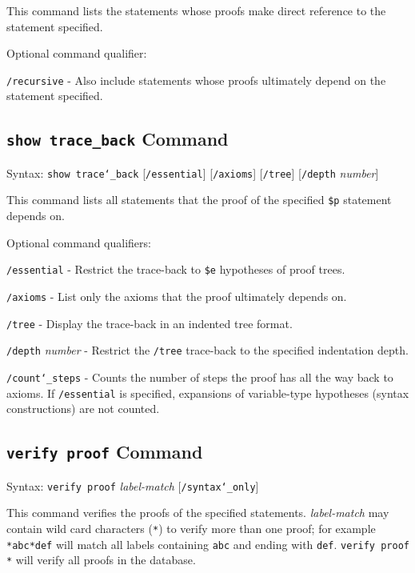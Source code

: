 This command lists the statements whose proofs make direct reference to
the statement specified.

Optional command qualifier:

    \texttt{/recursive} - Also include statements whose proofs ultimately
        depend on the statement specified.



\subsection{\texttt{show trace\_back} Command}
Syntax:  \texttt{show trace{\char`\_}back} [\texttt{/essential}] [\texttt{/axioms}]
    [\texttt{/tree}] [\texttt{/depth} {\em number}]

This command lists all statements that the proof of the specified
\texttt{\$p} statement depends on.

Optional command qualifiers:

    \texttt{/essential} - Restrict the trace-back to \texttt{\$e}
         hypotheses of proof trees.

    \texttt{/axioms} - List only the axioms that the proof ultimately depends on.

    \texttt{/tree} - Display the trace-back in an indented tree format.

    \texttt{/depth} {\em number} - Restrict the \texttt{/tree} trace-back to the
        specified indentation depth.

    \texttt{/count{\char`\_}steps} - Counts the number of steps the proof has
       all the way back to axioms.  If \texttt{/essential} is specified,
       expansions of variable-type hypotheses (syntax constructions) are not counted.

\subsection{\texttt{verify proof} Command}
Syntax:  \texttt{verify proof} {\em label-match} [\texttt{/syntax{\char`\_}only}]

This command verifies the proofs of the specified statements.  {\em
label-match} may contain wild card characters (\texttt{*}) to verify
more than one proof; for example \verb/*abc*def/ will match all labels
containing \texttt{abc} and ending with \texttt{def}.  \texttt{verify
proof *} will verify all proofs in the database.

